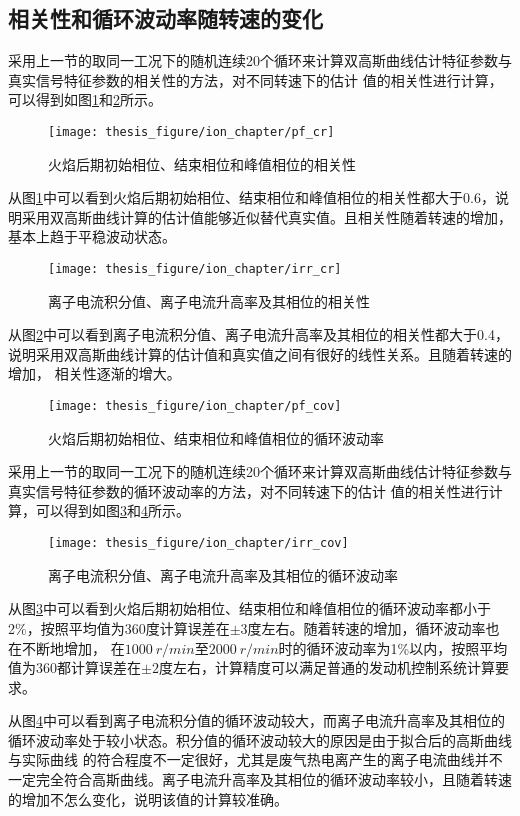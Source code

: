 \subsection{相关性和循环波动率随转速的变化}
采用上一节的取同一工况下的随机连续20个循环来计算双高斯曲线估计特征参数与真实信号特征参数的相关性的方法，对不同转速下的估计
值的相关性进行计算，可以得到如图\ref{fig:pf_cr}和\ref{fig:irr_cr}所示。
\begin{figure}[htb]
	\centering
	\texttt{[image: thesis\_figure/ion\_chapter/pf\_cr]}
	\caption{\label{fig:pf_cr}火焰后期初始相位、结束相位和峰值相位的相关性}
\end{figure}
从图\ref{fig:pf_cr}中可以看到火焰后期初始相位、结束相位和峰值相位的相关性都大于0.6，说明采用双高斯曲线计算的估计值能够近似替代真实值。且相关性随着转速的增加，
基本上趋于平稳波动状态。
\begin{figure}[htb]
	\centering
	\texttt{[image: thesis\_figure/ion\_chapter/irr\_cr]}
	\caption{\label{fig:irr_cr}离子电流积分值、离子电流升高率及其相位的相关性}
\end{figure}
从图\ref{fig:irr_cr}中可以看到离子电流积分值、离子电流升高率及其相位的相关性都大于0.4，说明采用双高斯曲线计算的估计值和真实值之间有很好的线性关系。且随着转速的增加，
相关性逐渐的增大。\par
\begin{figure}[htb]
	\centering
	\texttt{[image: thesis\_figure/ion\_chapter/pf\_cov]}
	\caption{\label{fig:pf_cov}火焰后期初始相位、结束相位和峰值相位的循环波动率}
\end{figure}
采用上一节的取同一工况下的随机连续20个循环来计算双高斯曲线估计特征参数与真实信号特征参数的循环波动率的方法，对不同转速下的估计
值的相关性进行计算，可以得到如图\ref{fig:pf_cov}和\ref{fig:irr_cov}所示。
\begin{figure}[htb]
	\centering
	\texttt{[image: thesis\_figure/ion\_chapter/irr\_cov]}
	\caption{\label{fig:irr_cov}离子电流积分值、离子电流升高率及其相位的循环波动率}
\end{figure}
从图\ref{fig:pf_cov}中可以看到火焰后期初始相位、结束相位和峰值相位的循环波动率都小于2\%，按照平均值为360度计算误差在$\pm3$度左右。随着转速的增加，循环波动率也在不断地增加，
在$1000~r/min$至$2000~r/min$时的循环波动率为1\%以内，按照平均值为360都计算误差在$\pm2$度左右，计算精度可以满足普通的发动机控制系统计算要求。\par
从图\ref{fig:irr_cov}中可以看到离子电流积分值的循环波动较大，而离子电流升高率及其相位的循环波动率处于较小状态。积分值的循环波动较大的原因是由于拟合后的高斯曲线与实际曲线
的符合程度不一定很好，尤其是废气热电离产生的离子电流曲线并不一定完全符合高斯曲线。离子电流升高率及其相位的循环波动率较小，且随着转速的增加不怎么变化，说明该值的计算较准确。

